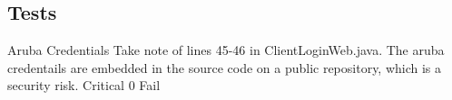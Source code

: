 \subsection{Tests}
\NonFuncReq
{Aruba Credentials}
{Take note of lines 45-46 in ClientLoginWeb.java. The aruba credentails are embedded in the source code on a public repository, which is a security risk.}
{Critical}
{0}
{Fail}
